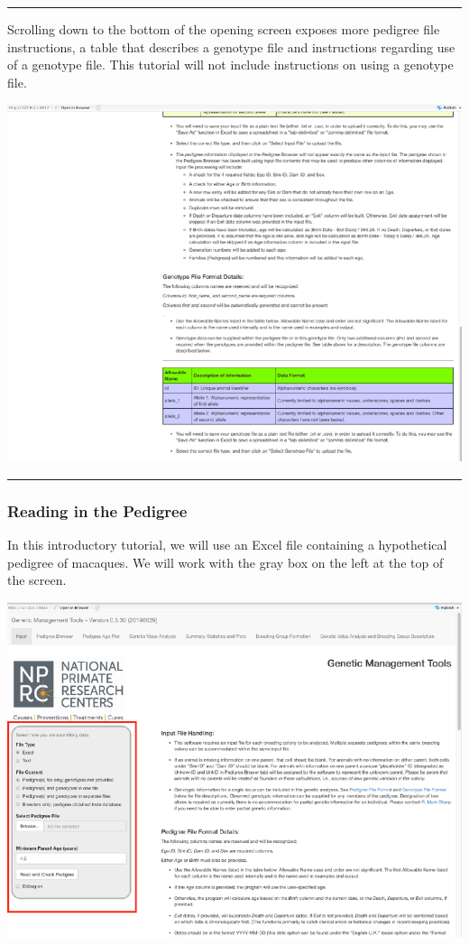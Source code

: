 \documentclass[
]{article}
\begin{document}
\begin{center}\rule{0.5\linewidth}{\linethickness}\end{center}

Scrolling down to the bottom of the opening screen exposes more pedigree
file instructions, a table that describes a genotype file and
instructions regarding use of a genotype file. This tutorial will not
include instructions on using a genotype file.

\includegraphics{shiny_app_use_files/figure-latex/eopening-screen-bottom-1.pdf}

\begin{center}\rule{0.5\linewidth}{\linethickness}\end{center}

\hypertarget{reading-in-the-pedigree}{%
\subsubsection{Reading in the Pedigree}\label{reading-in-the-pedigree}}

In this introductory tutorial, we will use an Excel file containing a
hypothetical pedigree of macaques. We will work with the gray box on the
left at the top of the screen.

\includegraphics{shiny_app_use_files/figure-latex/eopening-screen-top-red-oval-1.pdf}
\end{document}
